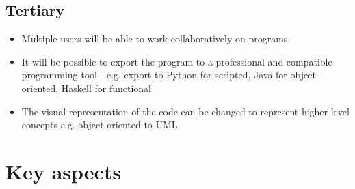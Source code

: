 \subsection{Tertiary}

\begin{itemize}
\item Multiple users will be able to work collaboratively on programs
\item It will be possible to export the program to a professional and compatible programming tool
\subitem - e.g. export to Python for scripted, Java for object-oriented, Haskell for functional
\item The visual representation of the code can be changed to represent higher-level concepts
\subitem e.g. object-oriented to UML
\end{itemize}

\section{Key aspects}
